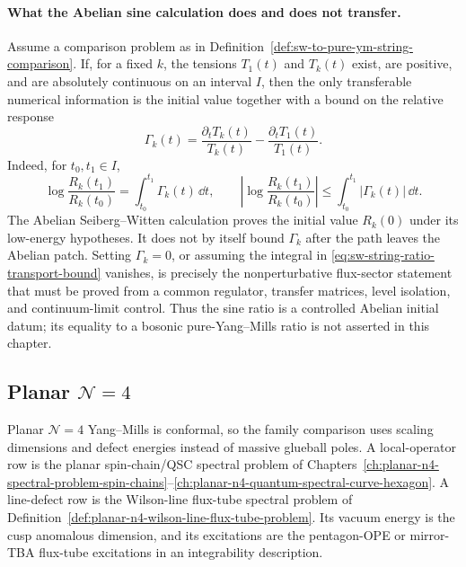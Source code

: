 \paragraph{What the Abelian sine calculation does and does not transfer.}
Assume a comparison problem as in
Definition~\ref{def:sw-to-pure-ym-string-comparison}.  If, for a fixed
\(k\), the tensions \(T_1(t)\) and \(T_k(t)\) exist, are positive, and are
absolutely continuous on an interval \(I\), then the only transferable
numerical information is the initial value together with a bound on the
relative response
\begin{equation}
  \Gamma_k(t)
  =
  \frac{\partial_tT_k(t)}{T_k(t)}
  -
  \frac{\partial_tT_1(t)}{T_1(t)} .
  \label{eq:sw-string-ratio-response}
\end{equation}
Indeed, for \(t_0,t_1\in I\),
\begin{equation}
  \log\frac{R_k(t_1)}{R_k(t_0)}
  =
  \int_{t_0}^{t_1}\Gamma_k(t)\,\dd t,
  \qquad
  \left|\log\frac{R_k(t_1)}{R_k(t_0)}\right|
  \le
  \int_{t_0}^{t_1}|\Gamma_k(t)|\,\dd t .
  \label{eq:sw-string-ratio-transport-bound}
\end{equation}
The Abelian Seiberg--Witten calculation proves the initial value
\(R_k(0)\) under its low-energy hypotheses.  It does not by itself bound
\(\Gamma_k\) after the path leaves the Abelian patch.  Setting
\(\Gamma_k=0\), or assuming the integral in
\eqref{eq:sw-string-ratio-transport-bound} vanishes, is precisely the
nonperturbative flux-sector statement that must be proved from a common
regulator, transfer matrices, level isolation, and continuum-limit control.
Thus the sine ratio is a controlled Abelian initial datum; its equality to a
bosonic pure-Yang--Mills ratio is not asserted in this chapter.

\subsection[Planar N=4]{Planar \(\mathcal N=4\)}

Planar \(\mathcal N=4\) Yang--Mills is conformal, so the family comparison uses
scaling dimensions and defect energies instead of massive glueball poles.  A
local-operator row is the planar spin-chain/QSC spectral problem of
Chapters~\ref{ch:planar-n4-spectral-problem-spin-chains}--\ref{ch:planar-n4-quantum-spectral-curve-hexagon}.  A line-defect row is the
Wilson-line flux-tube spectral problem of
Definition~\ref{def:planar-n4-wilson-line-flux-tube-problem}.  Its vacuum
energy is the cusp anomalous dimension, and its excitations are the
pentagon-OPE or mirror-TBA flux-tube excitations in an integrability
description.

